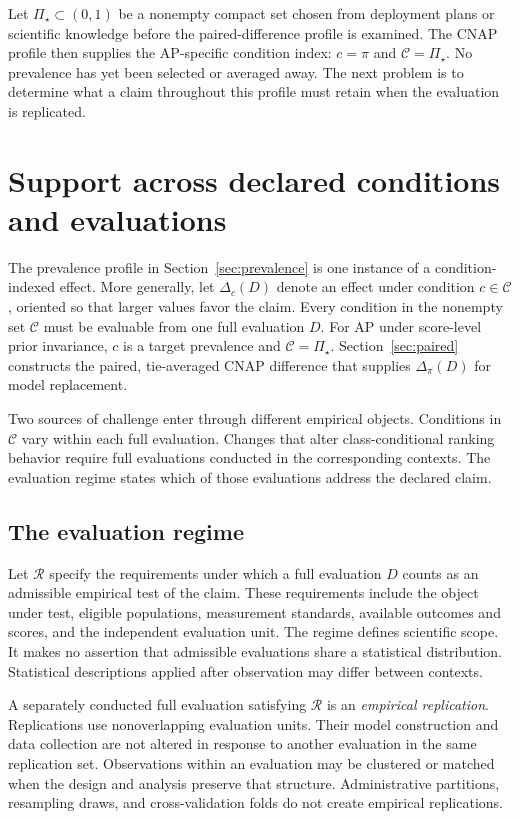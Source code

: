 \documentclass[11pt]{article}
\newcommand{\Regime}{\mathcal{R}}
\newcommand{\CSet}{\mathcal{C}}
\newcommand{\PSet}{\Pi_\star}
\theoremstyle{remark}
\begin{document}
Let $\PSet\subset(0,1)$ be a nonempty compact set chosen from deployment plans or scientific knowledge before the paired-difference profile is examined. The CNAP profile then supplies the AP-specific condition index: $c=\pi$ and $\CSet=\PSet$. No prevalence has yet been selected or averaged away. The next problem is to determine what a claim throughout this profile must retain when the evaluation is replicated.

\section{Support across declared conditions and evaluations}
\label{sec:support}

The prevalence profile in Section~\ref{sec:prevalence} is one instance of a condition-indexed effect. More generally, let $\Delta_c(D)$ denote an effect under condition $c\in\CSet$, oriented so that larger values favor the claim. Every condition in the nonempty set $\CSet$ must be evaluable from one full evaluation $D$. For AP under score-level prior invariance, $c$ is a target prevalence and $\CSet=\PSet$. Section~\ref{sec:paired} constructs the paired, tie-averaged CNAP difference that supplies $\Delta_\pi(D)$ for model replacement.

Two sources of challenge enter through different empirical objects. Conditions in $\CSet$ vary within each full evaluation. Changes that alter class-conditional ranking behavior require full evaluations conducted in the corresponding contexts. The evaluation regime states which of those evaluations address the declared claim.

\subsection{The evaluation regime}

Let $\Regime$ specify the requirements under which a full evaluation $D$ counts as an admissible empirical test of the claim. These requirements include the object under test, eligible populations, measurement standards, available outcomes and scores, and the independent evaluation unit. The regime defines scientific scope. It makes no assertion that admissible evaluations share a statistical distribution. Statistical descriptions applied after observation may differ between contexts.

A separately conducted full evaluation satisfying $\Regime$ is an \emph{empirical replication}. Replications use nonoverlapping evaluation units. Their model construction and data collection are not altered in response to another evaluation in the same replication set. Observations within an evaluation may be clustered or matched when the design and analysis preserve that structure. Administrative partitions, resampling draws, and cross-validation folds do not create empirical replications.
\end{document}
